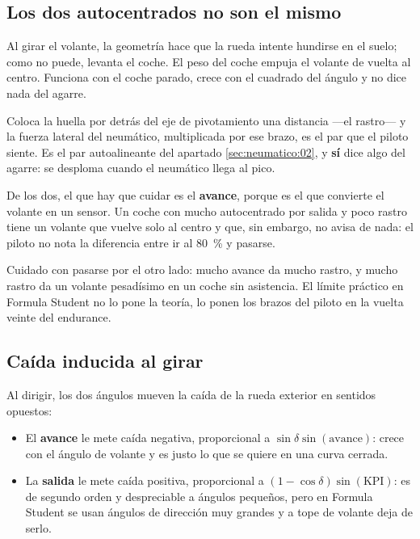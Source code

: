 \subsection{Los dos autocentrados no son el mismo}

\begin{description}[leftmargin=0pt,labelsep=0pt,style=nextline]
  \item[La salida centra por peso] Al girar el volante, la geometría hace que
    la rueda intente hundirse en el suelo; como no puede, levanta el coche. El
    peso del coche empuja el volante de vuelta al centro. Funciona con el coche
    parado, crece con el cuadrado del ángulo y no dice nada del agarre.
  \item[El avance centra por fuerza lateral] Coloca la huella por detrás del eje
    de pivotamiento una distancia ---el rastro--- y la fuerza lateral del
    neumático, multiplicada por ese brazo, es el par que el piloto siente. Es
    el par autoalineante del apartado \ref{sec:neumatico:02}, y \textbf{sí}
    dice algo del agarre: se desploma cuando el neumático llega al pico.
\end{description}

\begin{clave}
De los dos, el que hay que cuidar es el \textbf{avance}, porque es el que
convierte el volante en un sensor. Un coche con mucho autocentrado por salida y
poco rastro tiene un volante que vuelve solo al centro y que, sin embargo, no
avisa de nada: el piloto no nota la diferencia entre ir al \SI{80}{\percent} y
pasarse.

Cuidado con pasarse por el otro lado: mucho avance da mucho rastro, y mucho
rastro da un volante pesadísimo en un coche sin asistencia. El límite práctico
en Formula Student no lo pone la teoría, lo ponen los brazos del piloto en la
vuelta veinte del endurance.
\end{clave}

\subsection{Caída inducida al girar}

Al dirigir, los dos ángulos mueven la caída de la rueda exterior en sentidos
opuestos:

\begin{itemize}
  \item El \textbf{avance} le mete caída negativa, proporcional a
        $\sin\delta \sin(\text{avance})$: crece con el ángulo de volante y es
        justo lo que se quiere en una curva cerrada.
  \item La \textbf{salida} le mete caída positiva, proporcional a
        $(1-\cos\delta)\sin(\text{KPI})$: es de segundo orden y despreciable a
        ángulos pequeños, pero en Formula Student se usan ángulos de dirección
        muy grandes y a tope de volante deja de serlo.
\end{itemize}

